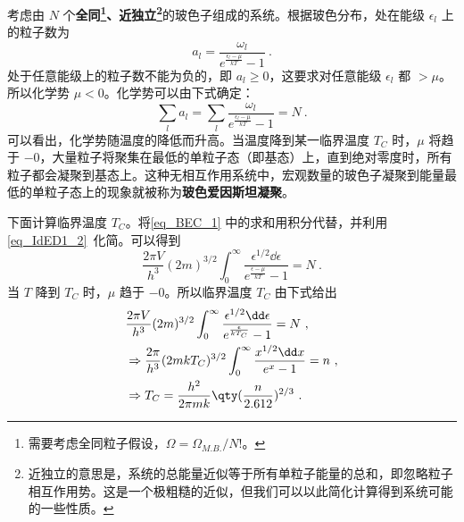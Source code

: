 

\begin{issues}
\issueDraft
\end{issues}


考虑由 $N$ 个\textbf{全同\footnote{需要考虑全同粒子假设，$\Omega=\Omega_{M.B.}/N!$。}、近独立\footnote{近独立的意思是，系统的总能量近似等于所有单粒子能量的总和，即忽略粒子相互作用势。这是一个极粗糙的近似，但我们可以以此简化计算得到系统可能的一些性质。}}的玻色子组成的系统。根据玻色分布，处在能级 $\epsilon_l$ 上的粒子数为
\begin{equation}
a_l=\frac{\omega_l}{e^{\frac{\epsilon_l-\mu}{kT}}-1}~.
\end{equation}
处于任意能级上的粒子数不能为负的，即 $a_l\ge 0$，这要求对任意能级 $\epsilon_l$ 都 $>\mu$。所以化学势 $\mu<0$。化学势可以由下式确定：
\begin{equation}\label{eq_BEC_1}
\sum_la_l=\sum_l \frac{\omega_l}{e^{\frac{\epsilon_l-\mu}{kT}}-1} =N~.
\end{equation}
可以看出，化学势随温度的降低而升高。当温度降到某一临界温度 $T_C$ 时，$\mu$ 将趋于 $-0$，大量粒子将聚集在最低的单粒子态（即基态）上，直到绝对零度时，所有粒子都会凝聚到基态上。这种无相互作用系统中，宏观数量的玻色子凝聚到能量最低的单粒子态上的现象就被称为\textbf{玻色爱因斯坦凝聚}。

下面计算临界温度 $T_C$。将\autoref{eq_BEC_1} 中的求和用积分代替，并利用\autoref{eq_IdED1_2}~化简。可以得到
\begin{equation}
\frac{2\pi V}{h^3}(2m)^{3/2}\int_0^\infty \frac{\epsilon^{1/2}\dd \epsilon}{e^{\frac{\epsilon-\mu}{kT}}-1}=N~.
\end{equation}
当 $T$ 降到 $T_C$ 时，$\mu$ 趋于 $-0$。所以临界温度 $T_C$ 由下式给出
\begin{equation}\label{eq_BEC_2}
\begin{aligned}
&\frac{2\pi V}{h^3}(2m)^{3/2}\int_0^\infty \frac{\epsilon^{1/2}\dd \epsilon}{e^{\frac{\epsilon}{kT_C}}-1}=N~,\\
&\Rightarrow \frac{2\pi}{h^3}(2mkT_C)^{3/2}\int_0^\infty \frac{x^{1/2}\dd x}{e^x-1}=n~,\\
&\Rightarrow T_C=\frac{h^2}{2\pi mk}\qty(\frac{n}{2.612})^{2/3}~.
\end{aligned}
\end{equation}


